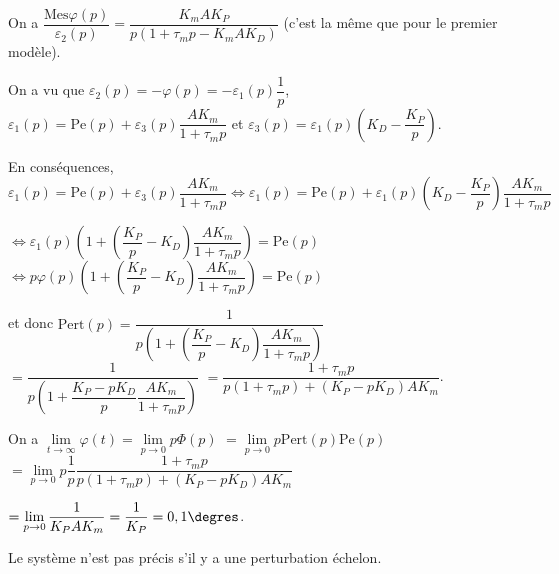 \ifprof
\begin{corrige}

On a  $\dfrac{\text{Mes}\varphi(p)}{\varepsilon_2(p)} = \dfrac{K_m A K_P}{p\left(1+\tau_m p-K_m A K_D \right)}$ (c'est la même que pour le premier modèle).

On a vu que  $\varepsilon_2(p) = -\varphi(p) = -\varepsilon_1(p)\dfrac{1}{p}$, $\varepsilon_1(p)=\text{Pe}(p)+\varepsilon_3(p)\dfrac{AK_m}{1+\tau_m p}$ et $\varepsilon_3(p)=\varepsilon_1(p)\left(K_D-\dfrac{K_P}{p} \right)$. 

En conséquences, $\varepsilon_1(p)=\text{Pe}(p)+\varepsilon_3(p)\dfrac{AK_m}{1+\tau_m p} \Longleftrightarrow 
\varepsilon_1(p)=\text{Pe}(p)+\varepsilon_1(p)\left(K_D-\dfrac{K_P}{p} \right)\dfrac{AK_m}{1+\tau_m p}$

$ \Leftrightarrow 
\varepsilon_1(p)\left( 1+\left(\dfrac{K_P}{p}-K_D \right)\dfrac{AK_m}{1+\tau_m p}\right)=\text{Pe}(p)$
$ \Leftrightarrow 
p\varphi(p)\left( 1+\left(\dfrac{K_P}{p}-K_D \right)\dfrac{AK_m}{1+\tau_m p}\right)=\text{Pe}(p)$

et donc $\text{Pert}(p)=\dfrac{1}{p\left( 1+\left(\dfrac{K_P}{p}-K_D \right)\dfrac{AK_m}{1+\tau_m p}\right)}$
$=\dfrac{1}{p\left( 1+\dfrac{K_P-pK_D}{p}\dfrac{AK_m}{1+\tau_m p}\right)}$
$=\dfrac{1+\tau_m p}{p \left(1+\tau_m p\right)+\left(K_P-pK_D\right)AK_m}$.



\end{corrige}
\else
\fi



\ifprof
\begin{corrige}
On a $\lim\limits_{t\to\infty}\varphi(t) = \lim\limits_{p\to 0}p\Phi(p)$ 
$=\lim\limits_{p\to 0}p\text{Pert}(p)\text{Pe}(p)$
  $= \lim\limits_{p\to 0}p\dfrac{1}{p} \dfrac{1+\tau_m p}{p \left(1+\tau_m p\right)+\left(K_P-pK_D\right)AK_m}$
  
  $= \lim\limits_{p\to 0}\dfrac{1}{K_PAK_m} =\dfrac{1}{K_P}=0,1\degres$.
  
Le système n'est pas précis s'il y a une perturbation échelon. 
\end{corrige}
\else
\fi

